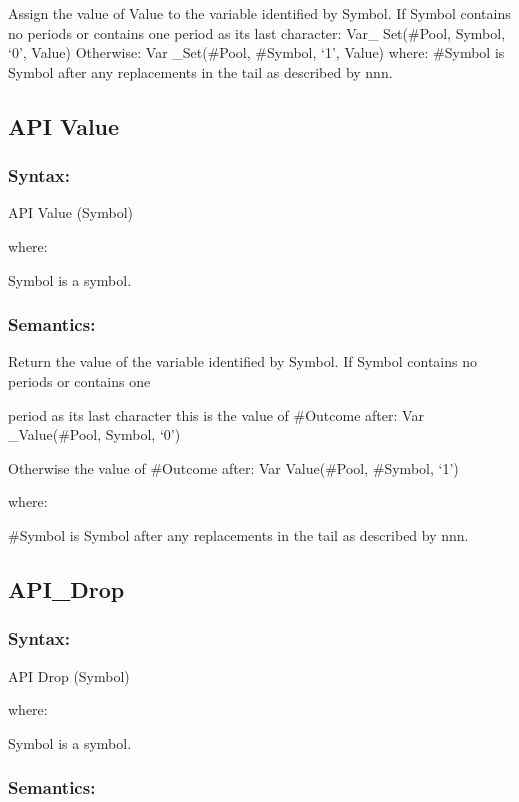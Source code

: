 Assign the value of Value to the variable identified by Symbol. If
Symbol contains no periods or contains one period as its last character:
Var\_ Set(\#Pool, Symbol, `0', Value) Otherwise: Var \_Set(\#Pool,
\#Symbol, `1', Value) where: \#Symbol is Symbol after any replacements
in the tail as described by nnn.

\subsection{API Value}\label{api-value}

\subsubsection{Syntax:}\label{syntax-51}

API Value (Symbol)

where:

Symbol is a symbol.

\subsubsection{Semantics:}\label{semantics-52}

Return the value of the variable identified by Symbol. If Symbol
contains no periods or contains one

period as its last character this is the value of \#Outcome after: Var
\_Value(\#Pool, Symbol, `0')

Otherwise the value of \#Outcome after: Var Value(\#Pool, \#Symbol, `1')

where:

\#Symbol is Symbol after any replacements in the tail as described by
nnn.

\subsection{API\_Drop}\label{api_drop}

\subsubsection{Syntax:}\label{syntax-52}

API Drop (Symbol)

where:

Symbol is a symbol.

\subsubsection{Semantics:}\label{semantics-53}

